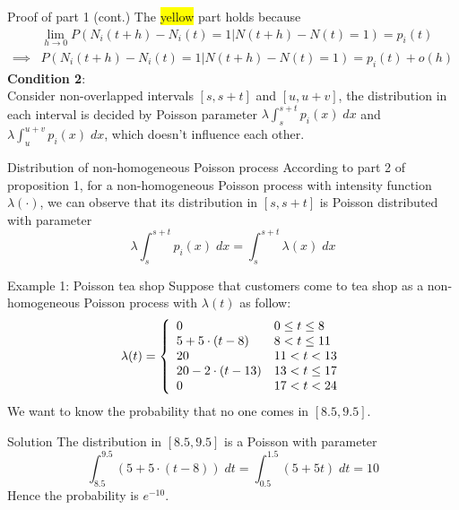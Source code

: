 \documentclass[mathserif]{beamer}
\begin{document}
\begin{frame}{Proof of part 1 (cont.)}
The \colorbox{yellow}{yellow} part holds because
\begin{align*}
& \lim_{h\to 0} P(N_i(t+h)-N_i(t) = 1 | N(t+h)-N(t) = 1) = p_i(t) \\
\implies & P(N_i(t+h)-N_i(t) = 1 | N(t+h)-N(t) = 1) = p_i(t) + o(h)
\end{align*}
\textbf{Condition 2}:\\
Consider non-overlapped intervals $[s,s+t]$ and $[u,u+v]$, 
the distribution in each interval is decided by Poisson parameter $\lambda\int_s^{s+t} p_i(x)\;dx$ and $\lambda\int_u^{u+v} p_i(x)\;dx$, which doesn't influence each other.
\end{frame}

\begin{frame}{Distribution of non-homogeneous Poisson process}
According to part 2 of proposition 1, 
for a non-homogeneous Poisson process with intensity function $\lambda(\cdot)$,
we can observe that its distribution in $[s,s+t]$ is Poisson distributed with parameter
\[
\lambda\int_s^{s+t} p_i(x)\;dx = \int_s^{s+t} \lambda(x)\;dx
\]
\end{frame}

\begin{frame}{Example 1: Poisson tea shop}
Suppose that customers come to tea shop as a non-homogeneous Poisson process with $\lambda(t)$ as follow:
\[
\lambda(t) = \left\{
\begin{array}{l l}
0 & 0\leq t\leq 8 \\
5 + 5\cdot(t-8) & 8 < t\leq 11 \\
20 & 11 < t < 13 \\
20 - 2\cdot(t-13) & 13 < t\leq 17 \\
0 & 17 < t < 24 \\
\end{array}
\right.
\]
We want to know the probability that no one comes in $[8.5,9.5]$.
\end{frame}

\begin{frame}{Solution}
The distribution in $[8.5,9.5]$ is a Poisson with parameter
\[
\int_{8.5}^{9.5} (5+5\cdot(t-8))\;dt = \int_{0.5}^{1.5} (5+5t)\;dt = 10
\]
Hence the probability is $e^{-10}$.
\end{frame}
\end{document}

